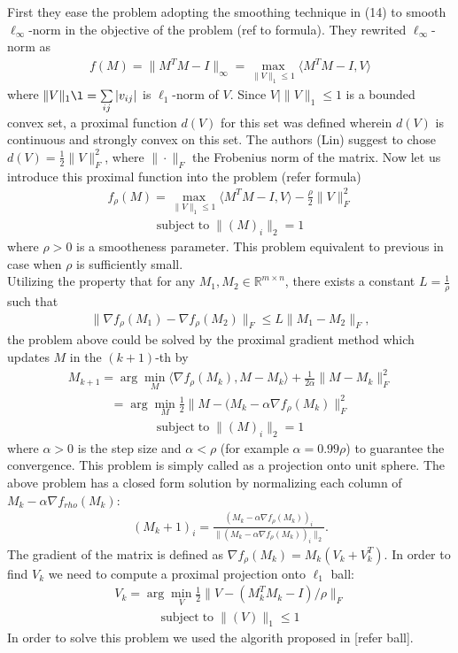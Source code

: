 \documentclass[journal]{IEEEtran}
\begin{document}
First they ease the problem adopting the smoothing technique in (14) to smooth $\ell_{\infty}$-norm in the objective of the problem (ref to formula). They rewrited $\ell_{\infty}$-norm  as
\begin{align}
f(M)=\|M^TM-I\|_{\infty}=\max_{\|V\|_1\leq 1}\langle M^TM-I,V  \rangle
\end{align}
where $\|V\|_1\l=\sum\limits_{ij} | v_{ij}|$ is $\ell_{1}$-norm of $V$. Since ${V| \|V\|_1\leq 1}$ is a bounded convex set, a proximal function $d(V)$ for this set was defined wherein $d(V)$  is continuous and strongly convex on this set. The authors (Lin) suggest to chose $d(V)=\frac{1}{2}\|V \|_F^2$, where $\|\cdot\|_F$ the Frobenius norm of the matrix. Now let us introduce this proximal function into the problem (refer formula) 
\begin{align}
f_{\rho}(M)=\max_{\|V\|_1\leq 1}\langle M^TM-I,V  \rangle-\frac{\rho}{2}\|V \|_F^2
\end{align}
\begin{align}
\textrm{subject}\;\textrm{to} \;\|(M)_i\|_2=1
\end{align}
where $\rho > 0$ is a smootheness parameter. This problem equivalent to previous in case when $\rho$ is sufficiently small.\\ 
Utilizing the property that for any $M_1,M_2\in\mathbb{R}^{m\times n}$, there exists a constant $L=\frac{1}{\rho}$ such that 
\begin{align}
\|  \nabla f_{\rho}(M_1) - \nabla f_{\rho}(M_2) \|_F\leq L\| M_1-M_2\|_F,
\end{align}
the problem above could be solved by the proximal gradient method which updates $M$ in the $(k +1)$-th by
\begin{align}
M_{k+1}=\arg\min\limits_{M} \langle \nabla f_{\rho} (M_k), M-M_k\rangle+\frac{1}{2\alpha}\| M-M_k  \|_F^2
\end{align}
\begin{align}
=\arg\min\limits_{M} \frac{1}{2}\|  M-(M_k-\alpha \nabla f_{\rho} (M_k)\|_F^2
\end{align}
\begin{align}
\textrm{subject}\;\textrm{to} \;\|(M)_i\|_2=1
\end{align}
where $\alpha>0$ is the step size and $\alpha<\rho$ (for example $\alpha=0.99\rho$) to guarantee the convergence. This problem is simply called as a projection onto unit sphere. The above problem has a closed form solution by normalizing each column of $M_k-\alpha \nabla f_{rho} (M_k)$:
\begin{align}
(M_k+1)_i=\frac{(M_k-\alpha \nabla f_{\rho} (M_k))_i}{\|(M_k-\alpha \nabla f_{\rho} (M_k))_i\|_2}.
\end{align}
The gradient of the matrix is defined as $ \nabla f_{\rho} (M_k)=M_k(V_k+V_k^T)$. In order to find $V_k$ we need to compute a proximal projection onto $\ell_1$ ball:
\begin{align}
V_k=\arg\min_{V}\frac{1}{2}\| V-(M_k^TM_k-I)/\rho  \|_F
\end{align}
\begin{align}
\textrm{subject}\;\textrm{to} \;\|(V)\|_1\leq1
\end{align}
In order to solve this problem we used the algorith proposed in [refer ball].
\end{document}
